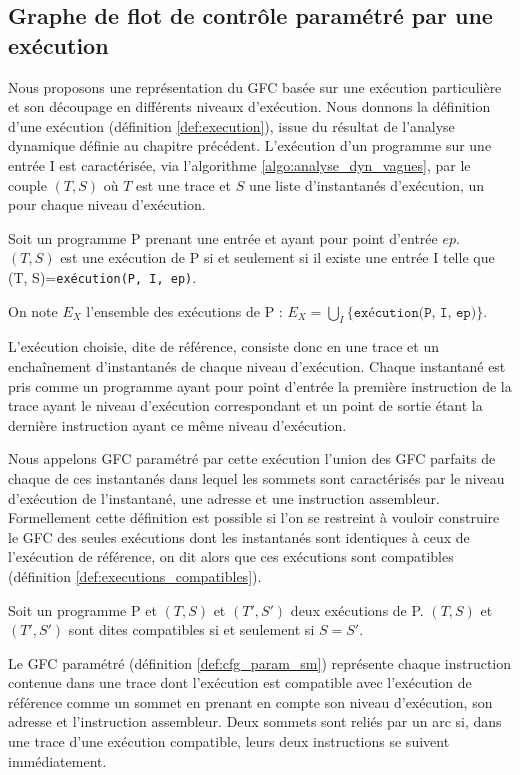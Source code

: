 \FloatBarrier
\subsection{Graphe de flot de contrôle paramétré par une exécution}
Nous proposons une représentation du GFC basée sur une exécution particulière et son découpage en différents niveaux d'exécution.
Nous donnons la définition d'une exécution (définition \ref{def:execution}), issue du résultat de l'analyse dynamique définie au chapitre précédent. L'exécution d'un programme sur une entrée I est caractérisée, via l'algorithme \ref{algo:analyse_dyn_vagues}, par le couple $(T, S)$ où $T$ est une trace et $S$ une liste d'instantanés d'exécution, un pour chaque niveau d'exécution.

\begin{defi}
 Soit un programme P prenant une entrée et ayant pour point d'entrée $ep$.
 $(T, S)$ est une exécution de P si et seulement si il existe une entrée I telle que (T, S)=\texttt{exécution(P, I, ep)}.
 
 On note $E_X$ l'ensemble des exécutions de P : $E_X=\bigcup_I\{\texttt{exécution(P, I, ep)}\}$.
\label{def:execution}
\end{defi}

L'exécution choisie, dite de référence, consiste donc en une trace et un enchaînement d'instantanés de chaque niveau d'exécution.
Chaque instantané est pris comme un programme ayant pour point d'entrée la première instruction de la trace ayant le niveau d'exécution correspondant et un point de sortie étant la dernière instruction ayant ce même niveau d'exécution.

Nous appelons GFC paramétré par cette exécution l'union des GFC parfaits de chaque de ces instantanés dans lequel les sommets sont caractérisés par le niveau d'exécution de l'instantané, une adresse et une instruction assembleur.
Formellement cette définition est possible si l'on se restreint à vouloir construire le GFC des seules exécutions dont les instantanés sont identiques à ceux de l'exécution de référence, on dit alors que ces exécutions sont compatibles (définition \ref{def:executions_compatibles}).

\begin{defi}
 Soit un programme P et $(T, S)$ et $(T', S')$ deux exécutions de P.
 $(T, S)$ et $(T', S')$ sont dites compatibles si et seulement si $S=S'$.
\label{def:executions_compatibles}
\end{defi}

Le GFC paramétré (définition \ref{def:cfg_param_sm}) représente chaque instruction contenue dans une trace dont l'exécution est compatible avec l'exécution de référence comme un sommet en prenant en compte son niveau d'exécution, son adresse et l'instruction assembleur. Deux sommets sont reliés par un arc si, dans une trace d'une exécution compatible, leurs deux instructions se suivent immédiatement.

